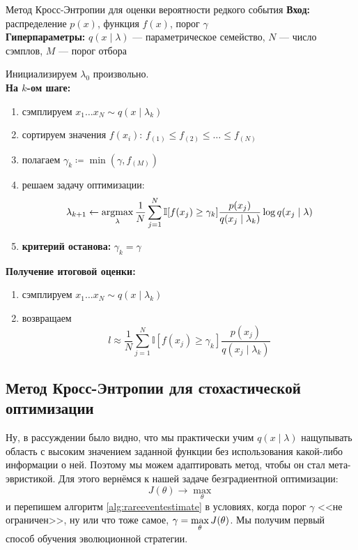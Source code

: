 \begin{algorithm}[label=alg:rareeventestimate]{Метод Кросс-Энтропии для оценки вероятности редкого события}
\textbf{Вход:} распределение $p(x)$, функция $f(x)$, порог $\gamma$ \\
\textbf{Гиперпараметры:} $q(x \mid \lambda)$ --- параметрическое семейство, $N$ --- число сэмплов, $M$ --- порог отбора

\vspace{0.3cm}
Инициализируем $\lambda_0$ произвольно. \\
\textbf{На $k$-ом шаге:}
\begin{enumerate}
    \item сэмплируем $x_1 \dots x_N \sim q(x \mid \lambda_k)$
    \item сортируем значения $f(x_i)$: $f_{(1)} \le f_{(2)} \le \dots \le f_{(N)}$
    \item полагаем $\gamma_k \coloneqq \min(\gamma, f_{(M)})$
    \item решаем задачу оптимизации:
    $$\lambda_{k+1} \leftarrow \mathop{\mathrm{argmax}}_{\lambda} \frac{1}{N} \sum_{j=1}^N \mathbb{I}[f(x_j) \ge \gamma_k]\frac{p(x_j)}{q(x_j \mid \lambda_k)} \log q(x_j \mid \lambda)$$
    \item \textbf{критерий останова:} $\gamma_k = \gamma$
\end{enumerate}

\textbf{Получение итоговой оценки:}
\begin{enumerate}
    \item сэмплируем $x_1 \dots x_N \sim q(x \mid \lambda_k)$
    \item возвращаем
    $$l \approx \frac{1}{N} \sum_{j=1}^N \mathbb{I}[f(x_j) \ge \gamma_k]\frac{p(x_j)}{q(x_j \mid \lambda_k)}$$
\end{enumerate}
\end{algorithm}

\subsection{Метод Кросс-Энтропии для стохастической оптимизации}

Ну, в рассуждении было видно, что мы практически учим $q(x \mid \lambda)$ нащупывать область с высоким значением заданной функции без использования какой-либо информации о ней. Поэтому мы можем адаптировать метод, чтобы он стал мета-эвристикой. Для этого вернёмся к нашей задаче безградиентной оптимизации:
$$J(\theta) \to \max_{\theta}$$
и перепишем алгоритм \ref{alg:rareeventestimate} в условиях, когда порог $\gamma$ <<не ограничен>>, ну или что тоже самое, $\gamma \HM= \max\limits_{\theta} J(\theta)$. Мы получим первый способ обучения эволюционной стратегии.

